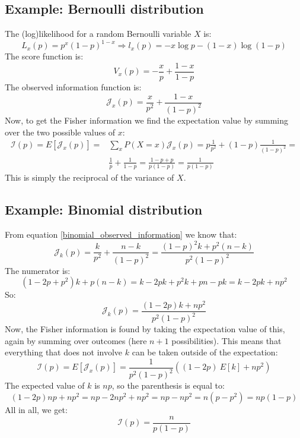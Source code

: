 \documentclass[12pt, a4paper]{article}
\numberwithin{equation}{section}
\begin{document}
\subsection{Example: Bernoulli distribution}
The (log)likelihood for a random Bernoulli variable $X$ is:
\begin{equation}
L_x(p)=p^x(1-p)^{1-x}\Rightarrow l_x(p)=-x\log p-(1-x)\log(1-p)
\end{equation}
The score function is:
\begin{equation}
V_x(p)=-\frac{x}{p}+\frac{1-x}{1-p}
\end{equation}
The observed information function is:
\begin{equation}
\mathcal{J}_x(p)=\frac{x}{p^2}+\frac{1-x}{(1-p)^2}
\end{equation}
Now, to get the Fisher information we find the expectation value by summing over the two possible values of $x$:
\begin{align}
\mathcal{I}(p)=E[\mathcal{J}_x(p)]=&\sum_x P(X=x)\mathcal{J}_x(p)=p\frac{1}{p^2}+(1-p)\frac{1}{(1-p)^2}= \\
&\frac{1}{p}+\frac{1}{1-p}=\frac{1-p+p}{p(1-p)}=\frac{1}{p(1-p)}
\end{align}
This is simply the reciprocal of the variance of $X$.

\subsection{Example: Binomial distribution}
From equation \ref{binomial_observed_information} we know that:
\begin{equation}
\mathcal{J}_k(p)=\frac{k}{p^2}+\frac{n-k}{(1-p)^2}=\frac{(1-p)^2 k+p^2(n-k)}{p^2(1-p)^2}
\end{equation}
The numerator is:
\begin{equation}
(1-2p+p^2)k+p(n-k)=k-2pk+p^2 k+pn-pk=k-2pk+np^2
\end{equation}
So:
\begin{equation}
\mathcal{J}_k(p)=\frac{(1-2p)k+np^2}{p^2(1-p)^2}
\end{equation}
Now, the Fisher information is found by taking the expectation value of this, again by summing over outcomes (here $n+1$ possibilities). This means that everything that does not involve $k$ can be taken outside of the expectation:
\begin{equation}
\mathcal{I}(p)=E[\mathcal{J}_x(p)]=\frac{1}{p^2(1-p)^2}((1-2p)\ E[k]+np^2)
\end{equation}
The expected value of $k$ is $np$, so the parenthesis is equal to:
\begin{equation}
(1-2p)np+np^2=np-2np^2+np^2=np-np^2=n(p-p^2)=np(1-p)
\end{equation}
All in all, we get:
\begin{equation}
\mathcal{I}(p)=\frac{n}{p(1-p)}
\end{equation}
\end{document}

